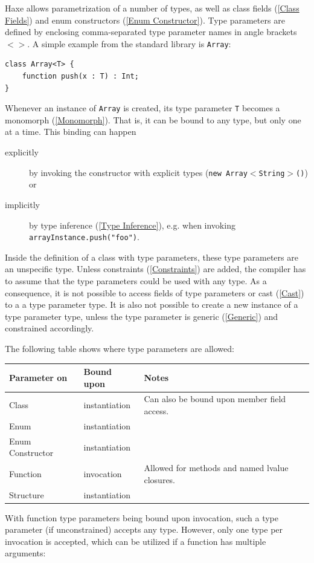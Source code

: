 \documentclass{article}
\newcommand{\type}[1]{\texttt{#1}}
\newcommand{\expr}[1]{\texttt{#1}}
\newcommand{\tref}[2]{#1 (\ref{#2})}
\begin{document}
Haxe allows parametrization of a number of types, as well as \tref{class fields}{Class Fields} and \tref{enum constructors}{Enum Constructor}. Type parameters are defined by enclosing comma-separated type parameter names in angle brackets \expr{$<>$}. A simple example from the standard library is \type{Array}:

\begin{lstlisting}
class Array<T> {
	function push(x : T) : Int;
}
\end{lstlisting}
Whenever an instance of \type{Array} is created, its type parameter \type{T} becomes a \tref{monomorph}{Monomorph}. That is, it can be bound to any type, but only one at a time. This binding can happen

\begin{description}
	\item[explicitly] by invoking the constructor with explicit types (\expr{new Array$<$String$>$()}) or
	\item[implicitly] by \tref{type inference}{Type Inference}, e.g. when invoking \expr{arrayInstance.push("foo")}.
\end{description}
Inside the definition of a class with type parameters, these type parameters are an unspecific type. Unless \tref{constraints}{Constraints} are added, the compiler has to assume that the type parameters could be used with any type. As a consequence, it is not possible to access fields of type parameters or \tref{cast}{Cast} to a a type parameter type. It is also not possible to create a new instance of a type parameter type, unless the type parameter is \tref{generic}{Generic} and constrained accordingly. 

The following table shows where type parameters are allowed:

\begin{center}
\begin{tabular}{| l | l | l |}
	\hline
	Parameter on & Bound upon & Notes \\ \hline
	Class & instantiation & Can also be bound upon member field access. \\
	Enum & instantiation & \\
	Enum Constructor & instantiation & \\
	Function & invocation & Allowed for methods and named lvalue closures. \\
	Structure & instantiation & \\ \hline
\end{tabular}
\end{center}
With function type parameters being bound upon invocation, such a type parameter (if unconstrained) accepts any type. However, only one type per invocation is accepted, which can be utilized if a function has multiple arguments:
\end{document}
